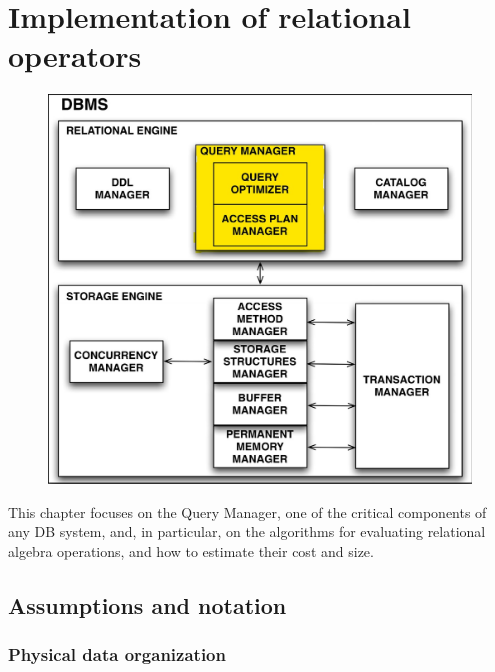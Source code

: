\section{Implementation of relational operators}

\begin{figure}[h!]
		\centering
		\includegraphics[scale = 0.7]{img/relop1.jpg}
		\label{part6}
\end{figure}

This chapter focuses on the Query Manager, one of the critical components of any DB system, and, in particular, on the algorithms for evaluating relational algebra operations, and how to estimate their cost and size.

\subsection{Assumptions and notation}

\subsubsection{Physical data organization}

